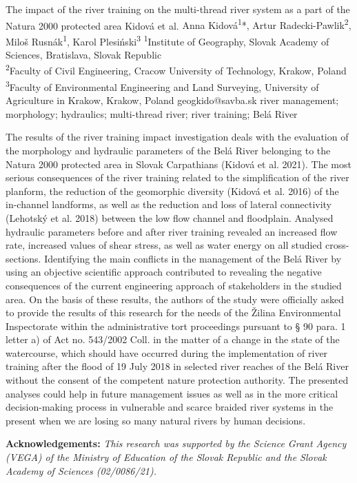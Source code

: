 \abstract
{The impact of the river training on the multi-thread river system as a part of the Natura 2000 protected area} 
{Kidová et al.} 
{Anna Kidová\textsuperscript{1}*, Artur Radecki-Pawlik\textsuperscript{2}, Miloš Rusnák\textsuperscript{1}, Karol Plesiński\textsuperscript{3}} 
{\TLtag} 
{
	\textsuperscript{1}Institute of Geography, Slovak Academy of Sciences, Bratislava, Slovak Republic\\
	\textsuperscript{2}Faculty of Civil Engineering, Cracow University of Technology, Krakow, Poland\\
	\textsuperscript{3}Faculty of Environmental Engineering and Land Surveying, University of Agriculture in Krakow, Krakow, Poland
}
{geogkido@savba.sk}  %
{river management; morphology; hydraulics; multi-thread river; river training; Belá River}
{The results of the river training impact investigation deals with the evaluation of the morphology and hydraulic parameters of the Belá River belonging to the Natura 2000 protected area in Slovak Carpathians (Kidová et al. 2021). The most serious consequences of the river training related to the simplification of the river planform, the reduction of the geomorphic diversity (Kidová et al. 2016) of the in-channel landforms, as well as the reduction and loss of lateral connectivity (Lehotský et al. 2018) between the low flow channel and floodplain. Analysed hydraulic parameters before and after river training revealed an increased flow rate, increased values of shear stress, as well as water energy on all studied cross-sections. Identifying the main conflicts in the management of the Belá River by using an objective scientific approach contributed to revealing the negative consequences of the current engineering approach of stakeholders in the studied area. On the basis of these results, the authors of the study were officially asked to provide the results of this research for the needs of the Žilina Environmental Inspectorate within the administrative tort proceedings pursuant to § 90 para. 1 letter a) of Act no. 543/2002 Coll. in the matter of a change in the state of the watercourse, which should have occurred during the implementation of river training after the flood of 19 July 2018 in selected river reaches of the Belá River without the consent of the competent nature protection authority. The presented analyses could help in future management issues as well as in the more critical decision-making process in vulnerable and scarce braided river systems in the present when we are losing so many natural rivers by human decisions.

\vspace{0.5em}
\noindent
\textbf{Acknowledgements:}
\textit{This research was supported by the Science Grant Agency (VEGA) of the Ministry of Education of the Slovak Republic and the Slovak Academy of Sciences (02/0086/21).}
}
